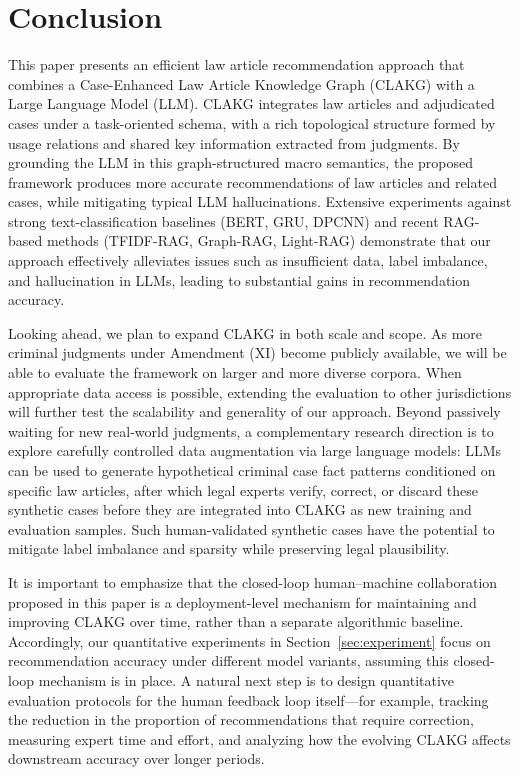 \documentclass[review,times,nonatbib]{elsarticle} %
\renewcommand{\textcolor}[2]{#2}
\begin{document}
\section{Conclusion}
\label{sec:conclusion}
\textcolor{blue}{This paper presents an efficient law article recommendation approach that combines a Case-Enhanced Law Article Knowledge Graph (CLAKG) with a Large Language Model (LLM). CLAKG integrates law articles and adjudicated cases under a task-oriented schema, with a rich topological structure formed by usage relations and shared key information extracted from judgments. By grounding the LLM in this graph-structured macro semantics, the proposed framework produces more accurate recommendations of law articles and related cases, while mitigating typical LLM hallucinations. Extensive experiments against strong text-classification baselines (BERT, GRU, DPCNN) and recent RAG-based methods (TFIDF-RAG, Graph-RAG, Light-RAG) demonstrate that our approach effectively alleviates issues such as insufficient data, label imbalance, and hallucination in LLMs, leading to substantial gains in recommendation accuracy.}

\textcolor{blue}{Looking ahead, we plan to expand CLAKG in both scale and scope. As more criminal judgments under Amendment (XI) become publicly available, we will be able to evaluate the framework on larger and more diverse corpora. When appropriate data access is possible, extending the evaluation to other jurisdictions will further test the scalability and generality of our approach. Beyond passively waiting for new real-world judgments, a complementary research direction is to explore carefully controlled data augmentation via large language models: LLMs can be used to generate hypothetical criminal case fact patterns conditioned on specific law articles, after which legal experts verify, correct, or discard these synthetic cases before they are integrated into CLAKG as new training and evaluation samples. Such human-validated synthetic cases have the potential to mitigate label imbalance and sparsity while preserving legal plausibility.}

\textcolor{blue}{It is important to emphasize that the closed-loop human--machine collaboration proposed in this paper is a deployment-level mechanism for maintaining and improving CLAKG over time, rather than a separate algorithmic baseline. Accordingly, our quantitative experiments in Section~\ref{sec:experiment} focus on recommendation accuracy under different model variants, assuming this closed-loop mechanism is in place. A natural next step is to design quantitative evaluation protocols for the human feedback loop itself---for example, tracking the reduction in the proportion of recommendations that require correction, measuring expert time and effort, and analyzing how the evolving CLAKG affects downstream accuracy over longer periods.}
\end{document}
